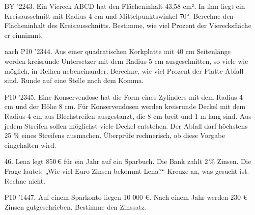 \documentclass[11pt]{article}
\begin{document}
\pfgruppe{}
\begin{pfaufg}{BY ’22}{43.}{}
Ein Viereck ABCD hat den Flächeninhalt 43,58 cm². In ihm liegt ein Kreisausschnitt mit Radius 4 cm und Mittelpunktswinkel 70°. Berechne den Flächeninhalt des Kreisausschnitts. Bestimme, wie viel Prozent der Vierecksfläche er einnimmt.
\par\smallskip\noindent {}\par
{}
\end{pfaufg}
\begin{pfaufg}{nach P10 ’23}{\llap{\textasteriskcentered\,}44.}{}
Aus einer quadratischen Korkplatte mit $40$ cm Seitenlänge werden kreisrunde Untersetzer mit dem Radius $5$ cm ausgeschnitten, so viele wie möglich, in Reihen nebeneinander. Berechne, wie viel Prozent der Platte Abfall sind. Runde auf eine Stelle nach dem Komma.
\end{pfaufg}
\pfgruppe{}
\begin{pfaufg}{P10 ’23}{\llap{\textasteriskcentered\,}45.}{}
Eine Konservendose hat die Form eines Zylinders mit dem Radius 4 cm und der Höhe 8 cm. Für Konservendosen werden kreisrunde Deckel mit dem Radius 4 cm aus Blechstreifen ausgestanzt, die 8 cm breit und 1 m lang sind. Aus jedem Streifen sollen möglichst viele Deckel entstehen. Der Abfall darf höchstens 25 \% eines Streifens ausmachen. Überprüfe rechnerisch, ob diese Vorgabe eingehalten wird.
\end{pfaufg}
\pfgruppe{}
\begin{pfaufg}{}{46.}{}
Lena legt 850\,€ für ein Jahr auf ein Sparbuch. Die Bank zahlt 2\,\% Zinsen. Die Frage lautet: „Wie viel Euro Zinsen bekommt Lena?“ Kreuze an, was gesucht ist. Rechne nicht. 
\end{pfaufg}
\pfgruppe{}
\begin{pfaufg}{P10 ’14}{47.}{}
Auf einem Sparkonto liegen 10 000 €. Nach einem Jahr werden 230 € Zinsen gutgeschrieben. Bestimme den Zinssatz.
\end{pfaufg}
\end{document}
